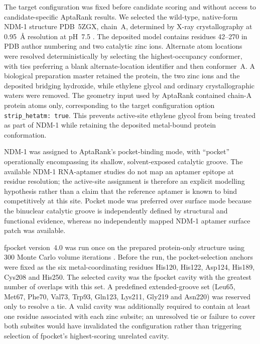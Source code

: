 The target configuration was fixed before candidate scoring and without access
to candidate-specific AptaRank results. We selected the wild-type, native-form
NDM-1 structure PDB~5ZGX, chain~A, determined by X-ray crystallography at
0.95~\AA{} resolution at pH~7.5 \cite{berman_protein_2000,zhang_active-site_2018}.
The deposited model contains residues 42--270 in PDB author numbering and two
catalytic zinc ions. Alternate atom locations were resolved deterministically
by selecting the highest-occupancy conformer, with ties preferring a blank
alternate-location identifier and then conformer~A. A biological preparation
master retained the protein, the two zinc ions and the deposited bridging
hydroxide, while ethylene glycol and ordinary crystallographic waters were
removed. The geometry input used by AptaRank contained chain-A protein atoms
only, corresponding to the target configuration option
\texttt{strip\_hetatm: true}. This prevents active-site ethylene glycol from
being treated as part of NDM-1 while retaining the deposited metal-bound
protein conformation.

NDM-1 was assigned to AptaRank's pocket-binding mode, with ``pocket''
operationally encompassing its shallow, solvent-exposed catalytic groove. The
available NDM-1 RNA-aptamer studies do not map an aptamer epitope at residue
resolution; the active-site assignment is therefore an explicit modelling
hypothesis rather than a claim that the reference aptamer is known to bind
competitively at this site. Pocket mode was preferred over surface mode because
the binuclear catalytic groove is independently defined by structural and
functional evidence, whereas no independently mapped NDM-1 aptamer surface
patch was available.

fpocket version~4.0 was run once on the prepared protein-only structure using
300 Monte Carlo volume iterations \cite{le_guilloux_fpocket_2009}. Before the
run, the pocket-selection anchors were fixed as the six metal-coordinating
residues His120, His122, Asp124, His189, Cys208 and His250. The selected cavity
was the fpocket cavity with the greatest number of overlaps with this set. A
predefined extended-groove set (Leu65, Met67, Phe70, Val73, Trp93, Gln123,
Lys211, Gly219 and Asn220) was reserved only to resolve a tie. A valid cavity
was additionally required to contain at least one residue associated with each
zinc subsite; an unresolved tie or failure to cover both subsites would have
invalidated the configuration rather than triggering selection of fpocket's
highest-scoring unrelated cavity.

